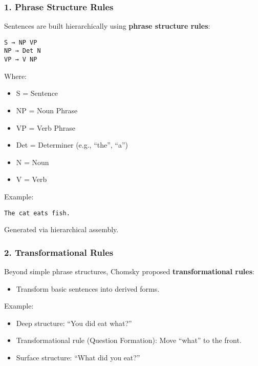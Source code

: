 \documentclass[12pt]{article}
\newcommand{\tightlist}{\itemsep 0pt\parskip 0pt\parsep 0pt}
\begin{document}
\hypertarget{phrase-structure-rules}{%
\subsubsection{1. Phrase Structure Rules}\label{phrase-structure-rules}}

Sentences are built hierarchically using \textbf{phrase structure
rules}:

\begin{verbatim}
S → NP VP
NP → Det N
VP → V NP
\end{verbatim}

Where:

\begin{itemize}
\tightlist
\item
  S = Sentence
\item
  NP = Noun Phrase
\item
  VP = Verb Phrase
\item
  Det = Determiner (e.g., ``the'', ``a'')
\item
  N = Noun
\item
  V = Verb
\end{itemize}

Example:

\begin{verbatim}
The cat eats fish.
\end{verbatim}

Generated via hierarchical assembly.

\hypertarget{transformational-rules}{%
\subsubsection{2. Transformational Rules}\label{transformational-rules}}

Beyond simple phrase structures, Chomsky proposed
\textbf{transformational rules}:

\begin{itemize}
\tightlist
\item
  Transform basic sentences into derived forms.
\end{itemize}

Example:

\begin{itemize}
\tightlist
\item
  Deep structure: ``You did eat what?''
\item
  Transformational rule (Question Formation): Move ``what'' to the
  front.
\item
  Surface structure: ``What did you eat?''
\end{itemize}
\end{document}

